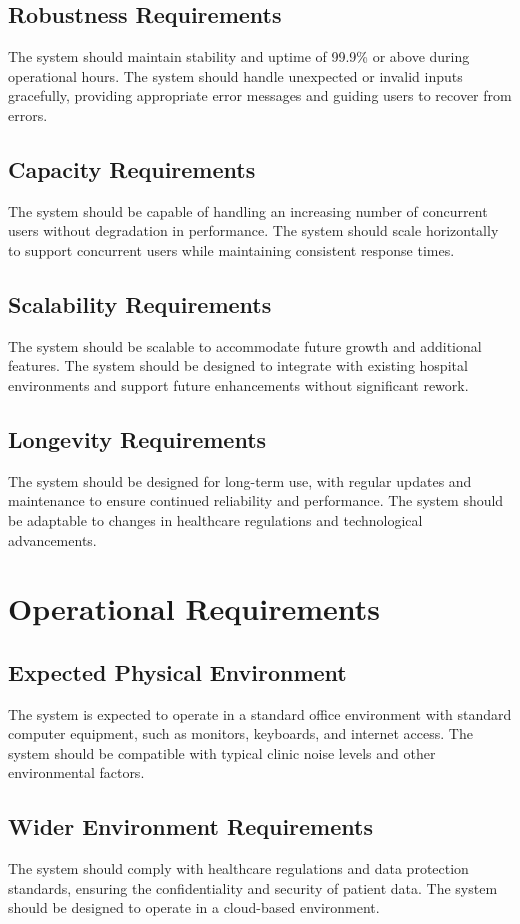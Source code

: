 \documentclass[12pt]{article}
\begin{document}
\subsection{Robustness Requirements}
The system should maintain stability and uptime of 99.9\% or above during operational hours. The system should handle unexpected or invalid inputs gracefully, providing appropriate error messages and guiding users to recover from errors.

\subsection{Capacity Requirements}
The system should be capable of handling an increasing number of concurrent users without degradation in performance. The system should scale horizontally to support concurrent users while maintaining consistent response times.

\subsection{Scalability Requirements}
The system should be scalable to accommodate future growth and additional features. The system should be designed to integrate with existing hospital environments and support future enhancements without significant rework.

\subsection{Longevity Requirements}
The system should be designed for long-term use, with regular updates and maintenance to ensure continued reliability and performance. The system should be adaptable to changes in healthcare regulations and technological advancements.

\section{Operational Requirements}
\subsection{Expected Physical Environment}
The system is expected to operate in a standard office environment with standard computer equipment, such as monitors, keyboards, and internet access. The system should be compatible with typical clinic noise levels and other environmental factors.

\subsection{Wider Environment Requirements}
The system should comply with healthcare regulations and data protection standards, ensuring the confidentiality and security of patient data. The system should be designed to operate in a cloud-based environment.
\end{document}
